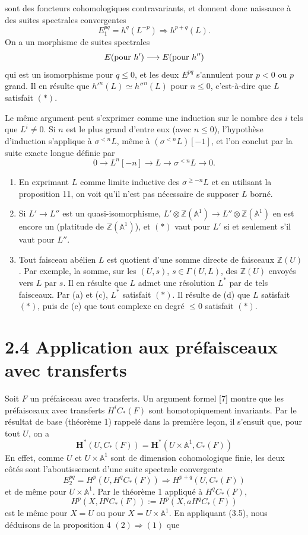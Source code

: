 \documentclass[11pt]{article}
\newcommand{\Aone}{\mathbb A^1}
\newcommand{\Z}{\mathbb Z}
\theoremstyle{deligne}
\begin{document}
sont des foncteurs cohomologiques contravariants, et donnent donc naissance à des suites spectrales convergentes
\[
E_1^{pq}=h^q(L^{-p})\Rightarrow h^{p+q}(L).
\]
On a un morphisme de suites spectrales
\[
E(\hbox{pour }h')\longrightarrow E(\hbox{pour }h'')
\]
qui est un isomorphisme pour \(q\le0\), et les deux \(E^{pq}\) s'annulent pour \(p<0\) ou \(p\) grand. Il en résulte que \(h'^n(L)\simeq h''^n(L)\) pour \(n\le0\), c'est-à-dire que \(L\) satisfait \((*)\).

Le même argument peut s'exprimer comme une induction sur le nombre des \(i\) tels que \(L^i\ne0\). Si \(n\) est le plus grand d'entre eux (avec \(n\le0\)), l'hypothèse d'induction s'applique à \(\sigma^{<n}L\), même à \((\sigma^{<n}L)[-1]\), et l'on conclut par la suite exacte longue définie par
\[
0\longrightarrow L^n[-n]\longrightarrow L\longrightarrow\sigma^{<n}L\longrightarrow0.
\]

\begin{enumerate}[label=(\alph*),start=3]
\item En exprimant \(L\) comme limite inductive des \(\sigma^{\ge-n}L\) et en utilisant la proposition 11, on voit qu'il n'est pas nécessaire de supposer \(L\) borné.
\item Si \(L'\to L''\) est un quasi-isomorphisme, \(L'\otimes\Z(\Aone)\to L''\otimes\Z(\Aone)\) en est encore un (platitude de \(\Z(\Aone)\)), et \((*)\) vaut pour \(L'\) si et seulement s'il vaut pour \(L''\).
\item Tout faisceau abélien \(L\) est quotient d'une somme directe de faisceaux \(\Z(U)\). Par exemple, la somme, sur les \((U,s)\), \(s\in\Gamma(U,L)\), des \(\Z(U)\) envoyés vers \(L\) par \(s\). Il en résulte que \(L\) admet une résolution \(L^*\) par de tels faisceaux. Par (a) et (c), \(L^*\) satisfait \((*)\). Il résulte de (d) que \(L\) satisfait \((*)\), puis de (c) que tout complexe en degré \(\le0\) satisfait \((*)\).
\end{enumerate}

\section*{2.4 Application aux préfaisceaux avec transferts}

Soit \(F\) un préfaisceau avec transferts. Un argument formel [7] montre que les préfaisceaux avec transferts \(H^i C_*(F)\) sont homotopiquement invariants. Par le résultat de base (théorème 1) rappelé dans la première leçon, il s'ensuit que, pour tout \(U\), on a
\[
\mathbf H^*(U,C_*(F))=\mathbf H^*(U\times\Aone,C_*(F)) \tag{4.1}
\]
En effet, comme \(U\) et \(U\times\Aone\) sont de dimension cohomologique finie, les deux côtés sont l'aboutissement d'une suite spectrale convergente
\[
E_2^{pq}=H^p(U,H^qC_*(F))\Rightarrow H^{p+q}(U,C_*(F))
\]
et de même pour \(U\times\Aone\). Par le théorème 1 appliqué à \(H^qC_*(F)\),
\[
H^p(X,H^qC_*(F)):=H^p(X,aH^qC_*(F))
\]
est le même pour \(X=U\) ou pour \(X=U\times\Aone\). En appliquant (3.5), nous déduisons de la proposition 4 \((2)\Rightarrow(1)\) que
\end{document}
